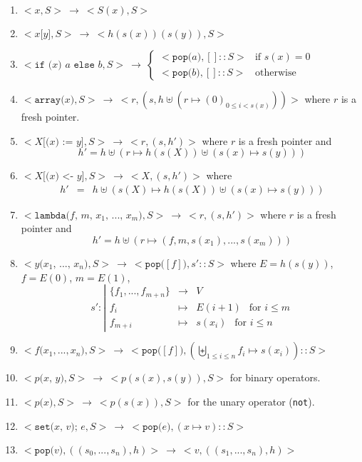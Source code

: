\documentclass[12pt,a4paper]{article}
\newcommand{\cl}[1]{\texttt{#1}}
\begin{document}
\begin{enumerate}
\itemsep-0.2em
\item $<x,S> \ \longrightarrow \ < S(x), S> $
\item $<x \cl{[} y \cl{]} , S> \ \longrightarrow \ < h(s(x))(s(y)) , S>$
\item $<\cl{if (} x \cl{) } a \cl{ else } b, S>  \ \longrightarrow \ 
\left\lbrace \begin{array}{ll}
< \cl{pop(}a\cl{)} , [] :: S > & \text{if } s(x) = 0 \\
< \cl{pop(}b\cl{)} , [] :: S > & \text{otherwise}
\end{array} \right. $
\item $<\cl{array(} x \cl{)} , S > \ \longrightarrow \ <r, \left(s, h \uplus \left( r \mapsto (0)_{0 \leq i < s(x)} \right) \right) >$ where $r$ is a fresh pointer.
\item $< X \cl{[(} x \cl{) := } y \cl{]} , S> \ \longrightarrow \ < r, (s, h') >$ where $r$ is a fresh pointer and
$$ h' = h \uplus \left( r \mapsto h( s(X) ) \uplus \left( s(x) \mapsto s(y) \right) \right) $$
\item $< X \cl{[(} x \cl{) <- } y \cl{]} , S> \ \longrightarrow \ < X, (s, h') >$ where
\begin{eqnarray*}
h' &=& h \uplus \left( s(X) \mapsto h( s(X) ) \uplus \left( s(x) \mapsto s(y) \right) \right)
\end{eqnarray*}
\item $< \cl{lambda(} f \cl{, } m \cl{, } x_1 \cl{, } ... \cl{, } x_m \cl{)} , S > \ \longrightarrow \ < r, (s, h') > $ where $r$ is a fresh pointer and
$$h' = h \uplus ( r \mapsto (f, m, s(x_1), ... , s(x_m) ) ) $$
\item $< y\cl{(} x_1 \cl{, } ... \cl{, } x_n \cl{)}, S> \ \longrightarrow \ < \cl{pop(} [f] \cl{)}, s' :: S>$ where $E = h(s(y))$, $f=E(0)$, $m=E(1)$,
$$ s' : \left| \begin{array}{ccl}
\{ f_1, ... , f_{m+n} \} & \rightarrow & V \\
f_i & \mapsto & E(i+1) \ \ \text{ for } i \leq m \\
f_{m+i} & \mapsto & s(x_i) \ \ \text{ for } i \leq n
\end{array} \right. $$
\item $<f\cl{(} x_1, ... , x_n \cl{)} , S> \ \longrightarrow \ < \cl{pop(} [f] \cl{)}, \left( \biguplus_{1 \leq i \leq n} f_i \mapsto s(x_i) \right) :: S > $
\item $< p\cl{(} x \cl{, } y \cl{)}, S> \ \longrightarrow \ < p( s(x) , s(y) ), S>$ for binary operators.
\item $< p\cl{(} x \cl{)}, S> \ \longrightarrow \ < p( s(x) ), S >$ for the unary operator (\cl{not}).
\item $<\cl{set(} x \cl{, } v \cl{); } e, S> \ \longrightarrow \ < \cl{pop(}e\cl{)}, (x \mapsto v) :: S> $
\item $<\cl{pop(} v \cl{)}, ( (s_0, ... , s_n), h) > \ \longrightarrow \ <v, ( (s_1, ... , s_n), h) > $
\end{enumerate}
\end{document}
